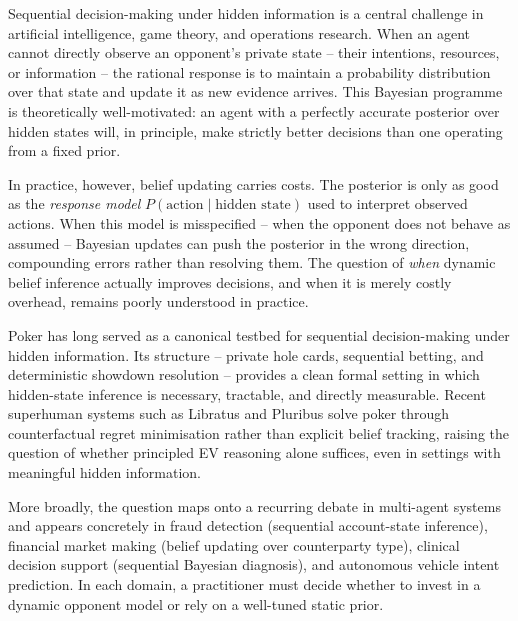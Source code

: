 \documentclass[12pt]{article}
\begin{document}
Sequential decision-making under hidden information is a central
challenge in artificial intelligence, game theory, and operations
research\cite{osborne1994course,pearl1988probabilistic}.
When an agent cannot directly observe an opponent's private state --
their intentions, resources, or information -- the rational response
is to maintain a probability distribution over that state and update
it as new evidence arrives\cite{pearl1988probabilistic,murphy2012ml}.
This Bayesian programme is theoretically well-motivated: an agent
with a perfectly accurate posterior over hidden states will, in
principle, make strictly better decisions than one operating from
a fixed prior\cite{koller1992complexity}.

In practice, however, belief updating carries costs.
The posterior is only as good as the \emph{response model}
$P(\text{action} \mid \text{hidden state})$ used to interpret
observed actions\cite{albrecht2018survey}.
When this model is misspecified -- when the opponent does not behave
as assumed -- Bayesian updates can push the posterior in the wrong
direction, compounding errors rather than resolving them\cite{gal2016dropout}.
The question of \emph{when} dynamic belief inference actually
improves decisions, and when it is merely costly overhead, remains
poorly understood in practice.

Poker has long served as a canonical testbed for sequential
decision-making under hidden information\cite{chen2006mathematics,
bowling2015holdem,brown2019superhuman}.
Its structure -- private hole cards, sequential betting, and
deterministic showdown resolution -- provides a clean formal
setting in which hidden-state inference is necessary, tractable,
and directly measurable\cite{koller1992complexity,zinkevich2007cfr}.
Recent superhuman systems such as Libratus and Pluribus
solve poker through counterfactual regret minimisation rather than
explicit belief tracking\cite{zinkevich2007cfr,brown2019superhuman},
raising the question of whether principled EV reasoning alone
suffices, even in settings with meaningful hidden information.

More broadly, the question maps onto a recurring debate in
multi-agent systems\cite{albrecht2018survey,tuyls2012multiagent}
and appears concretely in fraud detection (sequential account-state
inference\cite{dalpozzolo2015fraud}), financial market making
(belief updating over counterparty type\cite{glosten1985bid}),
clinical decision support (sequential Bayesian diagnosis\cite{obermeyer2016predicting}),
and autonomous vehicle intent
prediction\cite{bard2020hanabi,silver2016alphago}.
In each domain, a practitioner must decide whether to invest in
a dynamic opponent model or rely on a well-tuned static prior.
\end{document}
